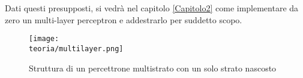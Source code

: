 Dati questi presupposti, si vedrà nel capitolo \ref{Capitolo2} come implementare da zero un multi-layer perceptron e addestrarlo per suddetto scopo.

\begin{figure}[h!]
 \centering
 \texttt{[image: \\teoria/multilayer.png]}
 \caption{Struttura di un percettrone multistrato con un solo strato nascosto}
 \label{fig:multilayer}
\end{figure}